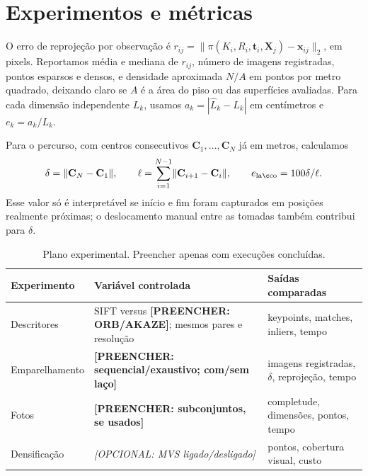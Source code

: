 \documentclass[10pt,a4paper]{article}
\newcommand{\Resultado}[1]{\textcolor{red!65!black}{\textbf{[PREENCHER: #1]}}}
\newcommand{\Opcional}[1]{\textcolor{blue!50!black}{\textit{[OPCIONAL: #1]}}}
\begin{document}
\section{Experimentos e métricas}
O erro de reprojeção por observação é $r_{ij}=\lVert\pi(K_i,R_i,\mathbf{t}_i,\mathbf{X}_j)-\mathbf{x}_{ij}\rVert_2$, em pixels. Reportamos média e mediana de $r_{ij}$, número de imagens registradas, pontos esparsos e densos, e densidade aproximada $N/A$ em pontos por metro quadrado, deixando claro se $A$ é a área do piso ou das superfícies avaliadas. Para cada dimensão independente $L_k$, usamos $a_k=|\hat L_k-L_k|$ em centímetros e $e_k=a_k/L_k$.

Para o percurso, com centros consecutivos $\mathbf{C}_1,\ldots,\mathbf{C}_N$ já em metros, calculamos
\begin{equation}
\delta=\lVert\mathbf{C}_N-\mathbf{C}_1\rVert,\qquad
\ell=\sum_{i=1}^{N-1}\lVert\mathbf{C}_{i+1}-\mathbf{C}_i\rVert,\qquad
e_{\rm laço}=100\delta/\ell.
\end{equation}
Esse valor só é interpretável se início e fim foram capturados em posições realmente próximas; o deslocamento manual entre as tomadas também contribui para $\delta$.

\begin{table}[h]
\centering\small
\caption{Plano experimental. Preencher apenas com execuções concluídas.}
\begin{tabularx}{\linewidth}{p{2.7cm}X p{4.0cm}}
\toprule
Experimento & Variável controlada & Saídas comparadas \\
\midrule
Descritores & SIFT versus \Resultado{ORB/AKAZE}; mesmos pares e resolução & keypoints, matches, inliers, tempo \\
Emparelhamento & \Resultado{sequencial/exaustivo; com/sem laço} & imagens registradas, $\delta$, reprojeção, tempo \\
Fotos & \Resultado{subconjuntos, se usados} & completude, dimensões, pontos, tempo \\
Densificação & \Opcional{MVS ligado/desligado} & pontos, cobertura visual, custo \\
\bottomrule
\end{tabularx}
\end{table}
\end{document}
